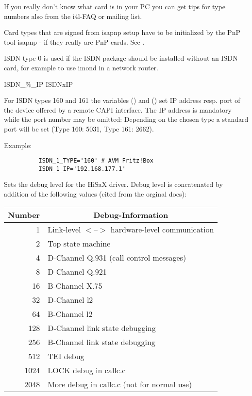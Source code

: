 \begin{description}
  If you really don't know what card is in your PC you can get tips for type numbers 
  also from the i4l-FAQ or mailing list.

  Card types that are signed \glqq{}from isapnp setup\grqq{} have to be initialized 
  by the PnP tool isapnp - if they really are PnP cards. See 
  .

  ISDN type 0 is used if the ISDN package should be installed without an ISDN card, 
  for example to use imond in a network router.

 {ISDN\_\%\_IP} {ISDNxIP}

  For ISDN types 160 and 161 the variables () and ()
  set IP address resp. port of the device offered by a remote CAPI interface.
  The IP address is mandatory while the port number may be omitted:
  Depending on the chosen type a standard port will be set (Type 160: 5031,
  Type 161: 2662).

  Example:
  \begin{example}
  \begin{verbatim}
          ISDN_1_TYPE='160' # AVM Fritz!Box
          ISDN_1_IP='192.168.177.1'
  \end{verbatim}
  \end{example}

  
  Sets the debug level for the HiSaX driver. Debug level is concatenated by addition 
  of the following values (cited from the orginal docs):\\
  
  \begin{tabular}[h!]{r|l}
   \multicolumn{1}{c|}{\textbf{Number}} & \multicolumn{1}{c}{\textbf{Debug-Information}} \\
   \hline
      1 & Link-level $<$--$>$ hardware-level communication \\
      2 & Top state machine \\
      4 & D-Channel Q.931 (call control messages) \\
      8 & D-Channel Q.921 \\
     16 & B-Channel X.75 \\
     32 & D-Channel l2 \\
     64 & B-Channel l2 \\
    128 & D-Channel link state debugging \\
    256 & B-Channel link state debugging \\
    512 & TEI debug \\
   1024 & LOCK debug in callc.c \\
   2048 & More debug in callc.c (not for normal use) \\
  \end{tabular}\latex{\\}


\end{description}

